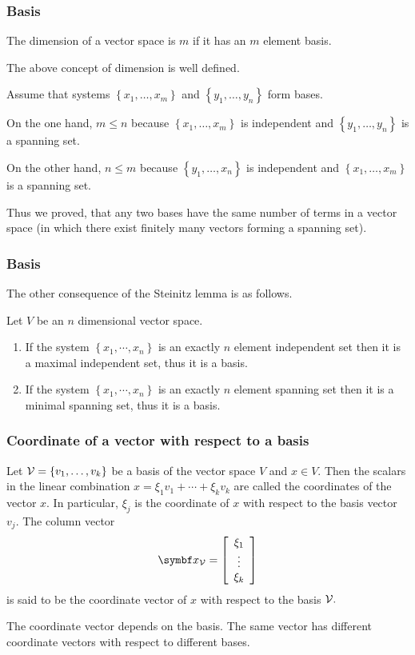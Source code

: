 \begin{frame}\frametitle{Basis}
\begin{definition}
The dimension of a vector space is $m$ if it has an $m$ element basis.
\end{definition}
The above concept of dimension is well defined.

Assume that systems $\left\{ x_1,\ldots,x_m \right\}$ and $\left\{ y_1,\ldots,y_n \right\}$ form bases.

On the one hand, $m\leq n$ because $\left\{ x_1,\ldots,x_m \right\}$ is independent and $\left\{ y_1,\ldots,y_n \right\}$ is a spanning set.

On the other hand, $n\leq m$ because $\left\{ y_1,\ldots,x_n \right\}$ is independent and $\left\{ x_1,\ldots,x_m \right\}$ is a spanning set.

Thus we proved, that 
\alert{any two bases have the same number of terms in a vector space}
(in which there exist finitely many vectors forming a spanning set).
\end{frame}

\begin{frame}\frametitle{Basis}
    The other consequence of the Steinitz lemma is as follows.
    \begin{proposition}
        Let $V$ be an $n$ dimensional vector space.
        \begin{enumerate}
            \item If the system $\left\{x_1,\cdots,x_n \right\}$ is an exactly $n$ element independent set
                then it is a maximal independent set, thus it is a basis.
            \item If the system $\left\{x_1,\cdots,x_n \right\}$ is an exactly $n$ element spanning set
                then it is a minimal spanning set, thus it is a basis.
        \end{enumerate}
    \end{proposition}
\end{frame}
%

\begin{frame}\frametitle{Coordinate of a vector with respect to a basis}
\begin{definition}
Let ${\cal V}=\{v_1,\ldots ,v_k\}$ be a basis of the vector space $V$ and $x\in V.$ Then the scalars in the linear combination $x=\xi_1v_1+\cdots +\xi_kv_k$ are called the coordinates of the vector $x.$ In particular, $\xi_j$ is the coordinate of $x$ with respect to the basis vector $v_j.$ The column vector 
$$\mathbf{x}_{\cal V}=\left[\begin{array}{c}
\xi_1\\
\vdots \\
\xi_k
\end{array}\right]$$
is said to be the coordinate vector of $x$ with respect to the basis ${\cal V}.$
\end{definition}

The coordinate vector depends on the basis. The same vector has different coordinate vectors with respect to different bases.
\end{frame}
